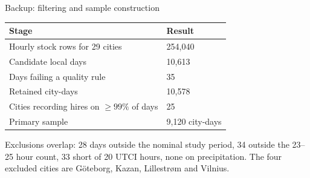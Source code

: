 \documentclass[aspectratio=169,11pt]{beamer}
\begin{document}
\begin{frame}{Backup: filtering and sample construction}
  \footnotesize
  \begin{tabular}{@{}p{5.0cm}p{7.4cm}@{}}
    \toprule
    \textbf{Stage} & \textbf{Result} \\
    \midrule
    Hourly stock rows for 29 cities & 254{,}040 \\
    Candidate local days & 10{,}613 \\
    Days failing a quality rule & 35 \\
    Retained city-days & 10{,}578 \\
    Cities recording hires on $\ge 99\%$ of days & 25 \\
    Primary sample & 9{,}120 city-days \\
    \bottomrule
  \end{tabular}
  \vspace{0.40cm}

  Exclusions overlap: 28 days outside the nominal study period, 34 outside the
  23--25 hour count, 33 short of 20 UTCI hours, none on precipitation.
  The four excluded cities are G\"oteborg, Kazan, Lillestr\o m and Vilnius.
\end{frame}
\end{document}
